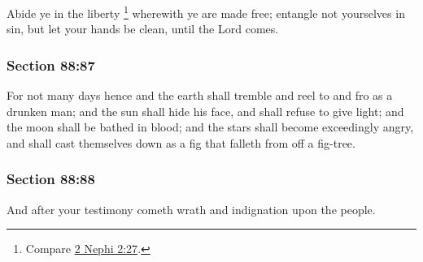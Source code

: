 		Abide ye in the liberty%
			\footnote{%
				Compare \hyperref[2NEPHI-2-27]{2 Nephi 2:27}.
				} 
		wherewith ye are made free; entangle not yourselves in sin, but let your hands be clean, until the Lord comes.


	\subsubsection{Section 88:87} %
		\label{DC88-87}

		For not many days hence and the earth shall tremble and reel to and fro as a drunken man; and the sun shall hide his face, and shall refuse to give light; and the moon shall be bathed in blood; and the stars shall become exceedingly angry, and shall cast themselves down as a fig that falleth from off a fig-tree.


	\subsubsection{Section 88:88} %
		\label{DC88-88}

		And after your testimony cometh wrath and indignation upon the people.


